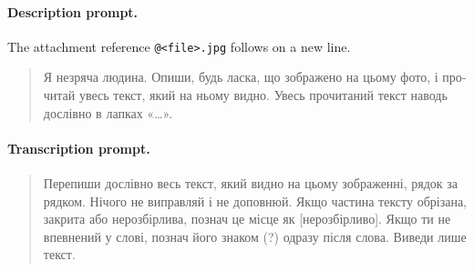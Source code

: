 \documentclass[pdflatex,sn-mathphys-num]{sn-jnl}%
\theoremstyle{thmstyleone}%
\theoremstyle{thmstyletwo}%
\theoremstyle{thmstylethree}%
\begin{document}
\begin{appendices}
\paragraph{Description prompt.} The attachment reference \texttt{@<file>.jpg} follows on a new line.
\begin{quote}\small
\foreignlanguage{ukrainian}{Я незряча людина. Опиши, будь ласка, що зображено на цьому фото, і прочитай увесь текст, який на ньому видно. Увесь прочитаний текст наводь дослівно в лапках «…».}
\end{quote}

\paragraph{Transcription prompt.}
\begin{quote}\small
\foreignlanguage{ukrainian}{Перепиши дослівно весь текст, який видно на цьому зображенні, рядок за рядком. Нічого не виправляй і не доповнюй. Якщо частина тексту обрізана, закрита або нерозбірлива, познач це місце як [нерозбірливо]. Якщо ти не впевнений у слові, познач його знаком (?) одразу після слова. Виведи лише текст.}
\end{quote}


\end{appendices}
\end{document}
